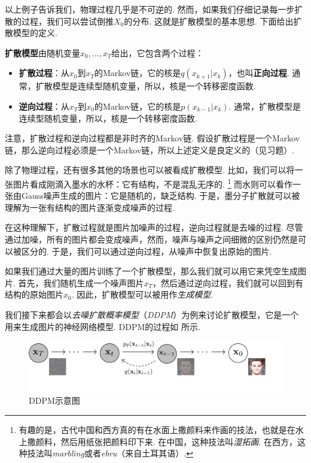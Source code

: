 以上例子告诉我们，物理过程几乎是不可逆的. 然而，如果我们仔细记录每一步扩散的过程，我们可以尝试倒推$X_0$的分布. 这就是扩散模型的基本思想. 下面给出扩散模型的定义.

\begin{definition}[扩散模型]
\textbf{扩散模型}由随机变量$x_0,\dots,x_T$给出，它包含两个过程：
\begin{itemize}
    \item \textbf{扩散过程}：从$x_0$到$x_T$的Markov链，它的核是$q(x_{k+1}|x_k)$，也叫\textbf{正向过程}. 通常，扩散模型是连续型随机变量，所以，核是一个转移密度函数. 
    
    \item \textbf{逆向过程}：从$x_T$到$x_0$的Markov链，它的核是$p(x_{k-1}|x_k)$. 通常，扩散模型是连续型随机变量，所以，核是一个转移密度函数. 
\end{itemize}
\end{definition}

注意，扩散过程和逆向过程都是非时齐的Markov链. 假设扩散过程是一个Markov链，那么逆向过程必须是一个Markov链，所以上述定义是良定义的（见习题）. 

除了物理过程，还有很多其他的场景也可以被看成扩散模型. 比如，我们可以将一张图片看成刚滴入墨水的水杯：它有结构，不是混乱无序的. \footnote{有趣的是，古代中国和西方真的有在水面上撒颜料来作画的技法，也就是在水上撒颜料，然后用纸张把颜料印下来. 在中国，这种技法叫\emph{湿拓画}. 在西方，这种技法叫\emph{marbling}或者\emph{ebru}（来自土耳其语）. } 而水则可以看作一张由Gauss噪声生成的图片：它是随机的，缺乏结构. 于是，墨分子扩散就可以被理解为一张有结构的图片逐渐变成噪声的过程. 

在这种理解下，扩散过程就是图片加噪声的过程，逆向过程就是去噪的过程. 尽管通过加噪，所有的图片都会变成噪声，然而，噪声与噪声之间细微的区别仍然是可以被区分的. 于是，我们可以通过逆向过程，从噪声中恢复出原始的图片. 

如果我们通过大量的图片训练了一个扩散模型，那么我们就可以用它来凭空生成图片. 首先，我们随机生成一个噪声图片$x_T$，然后通过逆向过程，我们就可以回到有结构的原始图片$x_0$. 因此，扩散模型可以被用作\emph{生成模型}. 

我们接下来都会以\emph{去噪扩散概率模型}（\emph{DDPM}）为例来讨论扩散模型，它是一个用来生成图片的神经网络模型. DDPM的过程如 所示. 

\begin{figure}[ht]
    \centering
    \includegraphics[scale=0.3]{Figures/Markov-chain/diffusion-model.pdf}
    \caption{DDPM示意图}\label{fig:DDPM}
\end{figure}

